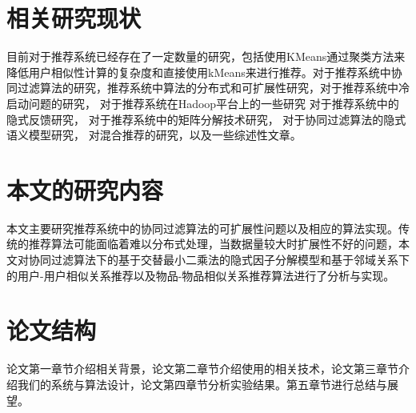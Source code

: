 \section{相关研究现状}
目前对于推荐系统已经存在了一定数量的研究，包括使用KMeans通过聚类方法来降低用户相似性计算的复杂度和直接使用kMeans来进行推荐\cite{Zahra:2015ja}\cite{Kularbphettong:2014vm}\cite{Dakhel:2011dt}。对于推荐系统中协同过滤算法的研究\cite{Shi:2014fj}\cite{Su:2009cl}，推荐系统中算法的分布式和可扩展性研究\cite{Cacheda:2011bh}\cite{Narang:2011iq}\cite{Schelter:2012jg}，对于推荐系统中冷启动问题的研究\cite{Liu:2014hc}，
对于推荐系统在Hadoop平台上的一些研究\cite{Zhao:2010ha}\cite{Jiang:2011bp}
对于推荐系统中的隐式反馈研究\cite{Hu:2008el}，
对于推荐系统中的矩阵分解技术研究\cite{Koren:2009jg}，
对于协同过滤算法的隐式语义模型研究\cite{hofmann2004latent}，
对混合推荐的研究\cite{Burke:2002fy}，以及一些综述性文章\cite{Portugal:2015vy}。

\section{本文的研究内容}
本文主要研究推荐系统中的协同过滤算法的可扩展性问题以及相应的算法实现。传统的推荐算法可能面临着难以分布式处理，当数据量较大时扩展性不好的问题，本文对协同过滤算法下的基于交替最小二乘法的隐式因子分解模型和基于邻域关系下的用户-用户相似关系推荐以及物品-物品相似关系推荐算法进行了分析与实现。
\section{论文结构}
论文第一章节介绍相关背景，论文第二章节介绍使用的相关技术，论文第三章节介绍我们的系统与算法设计，论文第四章节分析实验结果。第五章节进行总结与展望。